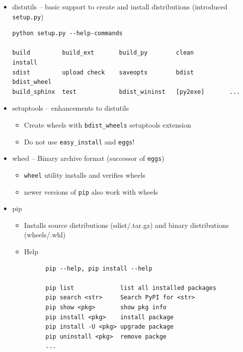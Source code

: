 \documentclass[9pt,a4wide]{extarticle}
\begin{document}
\begin{itemize}

\item distutils -- basic support to create and install distributions
  (introduced {\tt setup.py})

\begin{verbatim}
python setup.py --help-commands

build         build_ext       build_py        clean          install 
sdist         upload check    saveopts        bdist          bdist_wheel    
build_sphinx  test            bdist_wininst   [py2exe]       ...
\end{verbatim}

\item setuptools -- enhancements to distutils

   \begin{itemize}
   \item Create wheels with {\tt bdist\_wheels} setuptools extension
   \item Do not use {\tt easy\_install} and {\tt eggs}!
   \end{itemize}

\item wheel -- Binary archive format (successor of {\tt eggs})
      
   \begin{itemize}
   \item {\tt wheel} utility installs and verifies wheels
   \item newer versions of {\tt pip} also work with wheels
   \end{itemize}

\item pip 

   \begin{itemize}

   \item Installs source distributions (sdist/.tar.gz) and binary 
      distributions (wheels/.whl)

   \item Help
   
      \begin{verbatim}
      pip --help, pip install --help

      pip list             list all installed packages
      pip search <str>     Search PyPI for <str>
      pip show <pkg>       show pkg info
      pip install <pkg>    install package
      pip install -U <pkg> upgrade package
      pip uninstall <pkg>  remove packge
      ...
      \end{verbatim}


\end{itemize}
\end{itemize}
\end{document}
